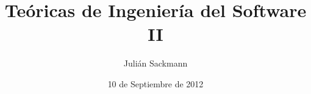 \documentclass[]{article}
\title{Teóricas de Ingeniería del Software II}
\author{ Julián Sackmann }
\date{10 de Septiembre de 2012}
\begin{document}
\ifpdf
{}
\else
{}
\fi

\setcounter{tocdepth}{4}

\newcommand{\ig}[2]{
\begin{center}
	\texttt{[image: images/\#2]}
\end{center}}
\newcommand{\subsubsubsection}[1]{\paragraph{#1}~\newline
 \indent }
\newcommand{\subsubsubsubsection}[1]{\subparagraph{#1}}
\newcommand{\partir}[4]{
\begin{minipage}[b]{#1\linewidth}\centering\begin{center}#3\end{center}\end{minipage}\begin{minipage}[b]{#2\linewidth}\centering\begin{center}#4\end{center}\end{minipage}
}
\newcommand{\flecha}[1]{\xrightarrow{\hspace*{0.3cm} #1 \hspace*{0.3cm}}}
\newcommand{\Flecha}[1]{\xRightarrow{\hspace*{0.3cm} #1 \hspace*{0.3cm}}}
\newcommand{\caja}[2]{\begin{center}
	\fbox{
		\parbox{#1\linewidth}{
			#2
		}
	}
\end{center}}
\renewcommand\contentsname{Índice}
\end{document}

